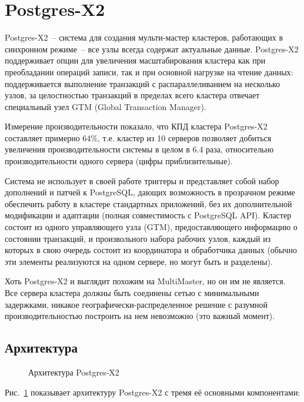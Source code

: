 \section{Postgres-X2}
\label{sec:postgres-x2}

Postgres-X2~-- система для создания мульти-мастер кластеров, работающих в синхронном режиме~-- все узлы всегда содержат актуальные данные. Postgres-X2 поддерживает опции для увеличения масштабирования кластера как при преобладании операций записи, так и при основной нагрузке на чтение данных: поддерживается выполнение транзакций с распараллеливанием на несколько узлов, за целостностью транзакций в пределах всего кластера отвечает специальный узел GTM (Global Transaction Manager).

Измерение производительности показало, что КПД кластера Postgres-X2 составляет примерно 64\%, т.е. кластер из 10 серверов позволяет добиться увеличения производительности системы в целом в 6.4 раза, относительно производительности одного сервера (цифры приблизительные).

Система не использует в своей работе триггеры и представляет собой набор дополнений и патчей к PostgreSQL, дающих возможность в прозрачном режиме обеспечить работу в кластере стандартных приложений, без их дополнительной модификации и адаптации (полная совместимость с PostgreSQL API). Кластер состоит из одного управляющего узла (GTM), предоставляющего информацию о состоянии транзакций, и произвольного набора рабочих узлов, каждый из которых в свою очередь состоит из координатора и обработчика данных (обычно эти элементы реализуются на одном сервере, но могут быть и разделены).

Хоть Postgres-X2 и выглядит похожим на MultiMaster, но он им не является. Все сервера кластера должны быть соединены сетью с минимальными задержками, никакое географически-распределенное решение с разумной производительностью построить на нем невозможно (это важный момент).

\subsection{Архитектура}
\label{sec:postgres-x2-architecture}

\begin{figure}[ht!]
  \caption{Архитектура Postgres-X2}
  \label{fig:postgres-x21}
\end{figure}

Рис.~\ref{fig:postgres-x21} показывает архитектуру Postgres-X2 с тремя её основными компонентами:

